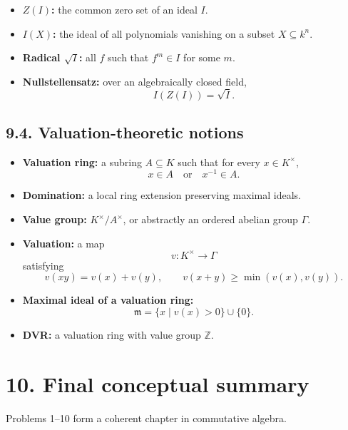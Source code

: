 \documentclass[12pt,a4paper]{article}
\theoremstyle{plain}
\theoremstyle{definition}      %
\begin{document}
\begin{itemize}
	\item \textbf{\(Z(I)\):} the common zero set of an ideal \(I\).
	\item \textbf{\(I(X)\):} the ideal of all polynomials vanishing on a subset \(X\subseteq k^n\).
	\item \textbf{Radical \(\sqrt{I}\):} all \(f\) such that \(f^m\in I\) for some \(m\).
	\item \textbf{Nullstellensatz:} over an algebraically closed field,
	\[
	I(Z(I))=\sqrt{I}.
	\]
\end{itemize}

\subsection*{9.4. Valuation-theoretic notions}

\begin{itemize}
	\item \textbf{Valuation ring:} a subring \(A\subseteq K\) such that for every \(x\in K^\times\),
	\[
	x\in A \quad\text{or}\quad x^{-1}\in A.
	\]
	\item \textbf{Domination:} a local ring extension preserving maximal ideals.
	\item \textbf{Value group:} \(K^\times/A^\times\), or abstractly an ordered abelian group \(\Gamma\).
	\item \textbf{Valuation:} a map
	\[
	v:K^\times\to \Gamma
	\]
	satisfying
	\[
	v(xy)=v(x)+v(y),\qquad v(x+y)\ge \min(v(x),v(y)).
	\]
	\item \textbf{Maximal ideal of a valuation ring:}
	\[
	\mathfrak m=\{x\mid v(x)>0\}\cup\{0\}.
	\]
	\item \textbf{DVR:} a valuation ring with value group \(\mathbb{Z}\).
\end{itemize}

\bigskip

\section*{10. Final conceptual summary}

Problems 1--10 form a coherent chapter in commutative algebra.
\end{document}
